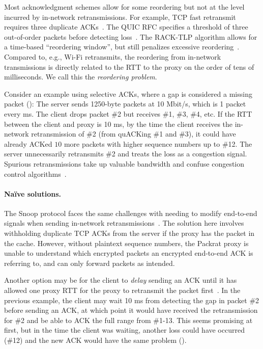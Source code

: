 Most acknowledgment schemes allow for some reordering but not at the level
incurred by in-network retransmissions. For example, TCP fast retransmit requires
three duplicate ACKs~\cite{rfc5681tcp}. The QUIC RFC specifies a threshold of three
out-of-order packets before detecting loss~\cite{rfc9002quic}. The RACK-TLP algorithm
allows for a time-based ``reordering window'', but still penalizes excessive
reordering~\cite{rfc8985}. Compared to, e.g., Wi-Fi retransmits, the
reordering from in-network transmissions is directly related to the RTT to
the proxy on the order of tens of milliseconds.
We call this the \textit{reordering problem}.

Consider an example using selective ACKs, where a gap is considered a missing
packet (): The server sends 1250-byte packets at 10 Mbit/s,
which is 1 packet every ms. The client drops packet \#2 but
receives \#1, \#3, \#4, etc. If the RTT between the client and proxy is 10 ms,
by the time the client receives the in-network retransmission of \#2 (from
quACKing \#1 and \#3), it could
have already ACKed $10$ more packets with higher sequence
numbers up to \#12. The server unnecessarily retransmits \#2 and treats the
loss as a congestion signal.
Spurious retransmissions take up valuable bandwidth and confuse congestion
control algorithms~\cite{leung2007overview}.

\paragraph{Na\"ive solutions.}

The Snoop protocol faces the same challenges with needing to modify end-to-end
signals when sending in-network retransmissions~\cite
{balakrishnan1995snoop}. The solution here involves withholding duplicate TCP
ACKs from the server if the proxy has the packet in the cache. However, without
plaintext sequence numbers, the Packrat proxy is unable to understand which
encrypted packets an encrypted end-to-end ACK is referring to, and can only
forward packets as intended.

Another option may be for the client to \textit{delay} sending an ACK until it
has allowed one proxy RTT for the proxy to retransmit the packet first~\cite{rfc3168}.
In the
previous example, the client may wait 10 ms from detecting the gap in
packet \#2 before sending an ACK, at which point it would have received the
retransmission for \#2 and be able to ACK the full range from \#1-13. This
seems promising at first, but in the time the client was waiting,
another loss could have occurred (\#12)
and the new ACK would have the same problem ().

